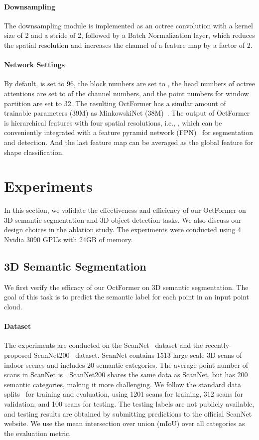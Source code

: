\documentclass[acmtog,screen,authorversion]{acmart}
\begin{document}
\paragraph{Downsampling}
The downsampling module is implemented as an octree convolution with a kernel size of 2 and a stride of 2, followed by a Batch Normalization layer, which reduces the spatial resolution and increases the channel of a feature map by a factor of 2.

\paragraph{Network Settings}
By default,  is set to 96, the block numbers are set to ,  the head numbers of octree attentions are set to  of the channel numbers, and the point numbers for window partition are set to 32.
The resulting OctFormer has a similar amount of trainable parameters (39M) as MinkowskiNet (38M)~\cite{Choy2019}.
The output of OctFormer is hierarchical features with four spatial resolutions, i.e., , which can be conveniently integrated with a feature pyramid network (FPN)~\cite{Lin2017} for segmentation and detection.
And the last feature map can be averaged as the global feature for shape classification.

 \section{Experiments} \label{sec:result}
In this section, we validate the effectiveness and efficiency of our OctFormer on 3D semantic segmentation and 3D object detection tasks.
We also discuss our design choices in the ablation study.
The experiments were conducted using 4 Nvidia 3090 GPUs with 24GB of memory.

\subsection{3D Semantic Segmentation} \label{sec:segmentation}
We first verify the efficacy of our OctFormer on 3D semantic segmentation.
The goal of this task is to predict the semantic label for each point in an input point cloud.

\paragraph{Dataset}
The experiments are conducted on the ScanNet~\cite{Dai2017a} dataset and the recently-proposed ScanNet200~\cite{Rozen2022} dataset.
ScanNet contains 1513 large-scale 3D scans of indoor scenes and includes 20 semantic categories.
The average point number of scans in ScanNet is .
ScanNet200 shares the same data as ScanNet, but has 200 semantic categories, making it more challenging.
We follow the standard data splits~\cite{Dai2017a} for training and evaluation, using 1201 scans for training, 312 scans for validation, and 100 scans for testing.
The testing labels are not publicly available, and testing results are obtained by submitting predictions to the official ScanNet website.
We use the mean intersection over union (mIoU) over all categories as the evaluation metric.
\end{document}
